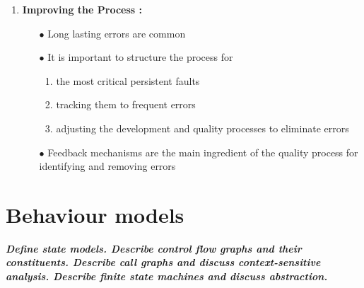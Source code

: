 \documentclass{article}
\begin{document}
\begin{enumerate}
\begin{itemize}
    \end{itemize}
     \item \textbf{Improving the
Process : }
    \begin{itemize}
        \item [$\bullet$]Long
lasting
errors
are
common

        \item [$\bullet$]It
is
important
to
structure
the
process
for
        \begin{enumerate}
    \item the
most
critical
persistent
faults
    \item tracking
them
to
frequent
errors
    \item adjusting
the
development
and
quality
processes
to
eliminate
errors
\end{enumerate}
        \item [$\bullet$]Feedback
mechanisms
are
the
main
ingredient
of
the
quality
process
for
identifying
and
removing
errors

    \end{itemize}
\end{enumerate}



\newpage
\section{Behaviour models}
\textbf{\textit{Define state models. Describe control flow graphs and their constituents. Describe call graphs and discuss context-sensitive analysis. Describe finite state machines and discuss abstraction.}}
\end{document}
